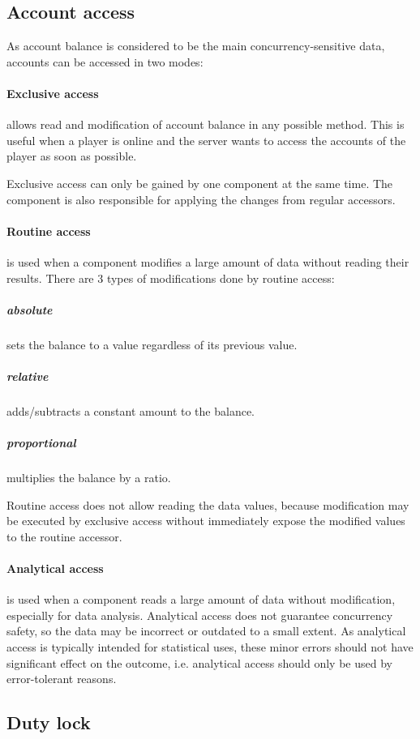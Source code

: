 \documentclass{report}
\begin{document}
				\subsection{Account access}

					As account balance is considered to be the main concurrency-sensitive data, accounts can be accessed in two modes:

					\paragraph{Exclusive access} allows read and modification of account balance in any possible method.
						This is useful when a player is online and the server wants to access the accounts of the player as soon as possible.

						Exclusive access can only be gained by one component at the same time.
						The component is also responsible for applying the changes from regular accessors.

					\paragraph{Routine access} is used when a component modifies a large amount of data without reading their results.
						There are 3 types of modifications done by routine access:
						\subparagraph{absolute} sets the balance to a value regardless of its previous value.
						\subparagraph{relative} adds/subtracts a constant amount to the balance.
						\subparagraph{proportional} multiplies the balance by a ratio.

						Routine access does not allow reading the data values, because modification may be executed by exclusive access
						without immediately expose the modified values to the routine accessor.

					\paragraph{Analytical access} is used when a component reads a large amount of data without modification, especially for data analysis.
					Analytical access does not guarantee concurrency safety, so the data may be incorrect or outdated to a small extent.
					As analytical access is typically intended for statistical uses, these minor errors should not have significant effect on the outcome,
					i.e. analytical access should only be used by error-tolerant reasons.

				\subsection{Duty lock}
\end{document}
